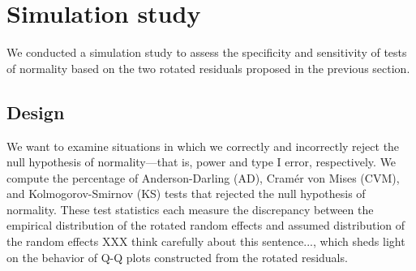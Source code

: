 \documentclass[12pt]{article} %
\newcommand{\al}[1]{{\color{red} #1}}
\newcommand{\trans}{\ensuremath{^\prime}}
\begin{document}


\section{Simulation study}\label{sec:simulation}

We conducted a simulation study to assess the specificity and sensitivity of tests of normality based on the two rotated residuals proposed in the previous section. 

\subsection{Design}\label{sec:sim-design}

We want to examine situations in which we correctly and incorrectly reject the null hypothesis of normality---that is, power and type I error, respectively. We compute the percentage of Anderson-Darling (AD), Cram{\'e}r von Mises (CVM), and Kolmogorov-Smirnov (KS) tests that rejected the null hypothesis of normality.
 These test statistics each measure the discrepancy between the empirical distribution of the rotated random effects and assumed distribution of the random effects \al{XXX think carefully about this sentence...}, which sheds light on the behavior of Q-Q plots constructed from the rotated residuals. 
\end{document}
